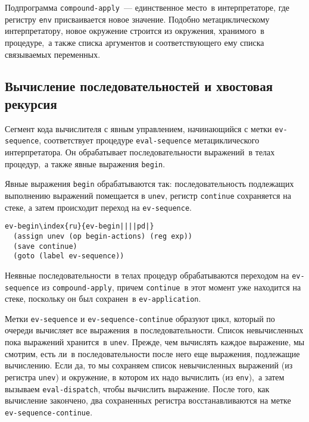 Подпрограмма {\tt compound-apply}~--- единственное
место~в интерпретаторе, где регистру {\tt env} присваивается
новое значение.  Подобно метациклическому интерпретатору, новое
окружение строится из окружения, хранимого~в процедуре,~а также списка
аргументов и соответствующего ему списка связываемых переменных.

\subsection{Вычисление последовательностей и хвостовая
рекурсия}
\label{SEQUENCE-EVALUATION-AND-TAIL-RECURSION}


Сегмент кода вычислителя с явным управлением, начинающийся
с метки {\tt ev-sequence}, соответствует процедуре
{\tt eval-sequence} метациклического интерпретатора.  Он
обрабатывает последовательности выражений~в телах процедур,~а также
явные выражения {\tt begin}.

Явные выражения {\tt begin} обрабатываются так:
последовательность подлежащих выполнению выражений помещается в
{\tt unev}, регистр {\tt continue} сохраняется на стеке,
а затем происходит переход на {\tt ev-sequence}.

\begin{Verbatim}[fontsize=\small]
ev-begin\index{ru}{ev-begin||||pd|}
  (assign unev (op begin-actions) (reg exp))
  (save continue)
  (goto (label ev-sequence))
\end{Verbatim}
Неявные последовательности~в телах процедур обрабатываются переходом
на {\tt ev-sequence} из {\tt compound-apply}, причем
{\tt continue}~в этот момент уже находится на стеке, поскольку
он был сохранен~в {\tt ev-application}.

Метки {\tt ev-sequence} и
{\tt ev-sequence-continue} образуют цикл, который по очереди
вычисляет все выражения~в последовательности.  Список невычисленных
пока выражений хранится~в {\tt unev}.  Прежде, чем вычислять
каждое выражение, мы смотрим, есть ли~в последовательности после него еще
выражения, подлежащие вычислению.  Если да, то мы сохраняем список
невычисленных выражений (из регистра {\tt unev}) и окружение, в
котором их надо вычислить (из {\tt env}),~а затем вызываем
{\tt eval-dispatch}, чтобы вычислить выражение.  После того,
как вычисление закончено, два сохраненных регистра восстанавливаются
на метке {\tt ev-sequence-continue}.

